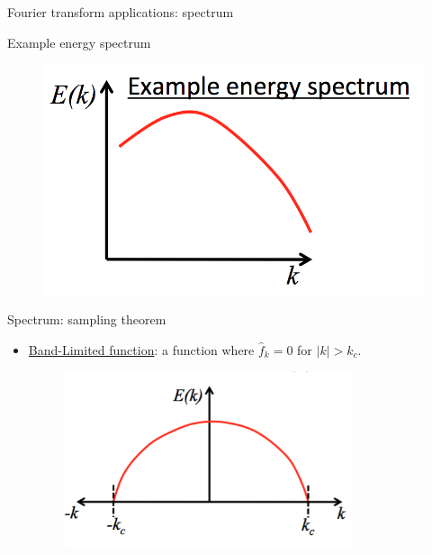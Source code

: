 \begin{frame}{Fourier transform applications: spectrum}

Example energy spectrum
\begin{figure}
	\includegraphics[width=\textwidth]{spectrum1.png}
\end{figure}
\end{frame}

\begin{frame}{Spectrum: sampling theorem}
\begin{itemize}
	\item \underline{Band-Limited function}: a function where $\hat f_k = 0$ for $|k| > k_c$.
	\begin{figure}
		\includegraphics[width=0.8\textwidth]{sampling1.png}
	\end{figure}
\end{itemize}
\end{frame}

